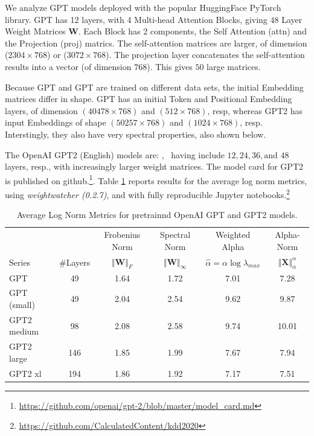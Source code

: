We analyze GPT models deployed with the popular HuggingFace PyTorch library.
GPT has 12 layers, with 4 Multi-head Attention Blocks, giving $48$ Layer Weight Matrices $\mathbf{W}$.
Each Block has 2 components, the Self Attention (attn) and the Projection (proj) matrics.  
The self-attention  matrices are larger, of dimension ($2304\times 768$) or ($3072\times 768$).
The projection layer concatenates the self-attention results into a vector (of dimension $768$).
This gives $50$ large matrices.

Because GPT and GPT are trained on different data sets, the initial Embedding matrices differ in shape.
GPT  has an initial Token and Positional Embedding layers, of dimension
$(40478\times 768)$ and $(512\times 768)$, resp, whereas GPT2 has input Embeddings of shape
$(50257\times 768)$ and $(1024\times 768)$, resp.  Interstingly, they also have very spectral properties,
also shown below.

The OpenAI GPT2 (English) models are: , \
having include $12, 24, 36, \text{and }48$ layers, resp., with increasingly larger weight matrices.
The model card for GPT2 is published on github.\footnote{\url{https://github.com/openai/gpt-2/blob/master/model_card.md}}.
Table \ref{table:nlp} reports results for the average log norm metrics, using \emph{weightwatcher (0.2.7)},
and with fully reproducible Jupyter notebooks.\footnote{\url{https://github.com/CalculatedContent/kdd2020}}


\begin{table}[t]
\small
\begin{center}
\begin{tabular}{|p{1in}|c|c|c|c|c|}
\hline
   &    & Frobenius Norm & Spectral Norm & Weighted Alpha & Alpha-Norm \\
 Series & \#Layers   & $\Vert\mathbf{W}\Vert_{F}$ & $\Vert\mathbf{W}\Vert_{\infty}$ & $\hat{\alpha}=\alpha\log\lambda_{max}$ & $\Vert\mathbf{X}\Vert^{\alpha}_{\alpha}$ \\
\hline
GPT & 49 & 1.64  & 1.72 & 7.01 & 7.28 \\
GPT (small) & 49 & 2.04  & 2.54& 9.62 & 9.87 \\
GPT2 medium & 98 & 2.08 & 2.58& 9.74 & 10.01 \\
GPT2 large & 146 & 1.85 & 1.99& 7.67 & 7.94 \\
GPT2 xl & 194 & 1.86 & 1.92 & 7.17 & 7.51 \\
\hline
\end{tabular}
\end{center}
\caption{Average Log Norm Metrics for pretrainnd OpenAI GPT and GPT2 models.}
\label{table:nlp}
\end{table}


